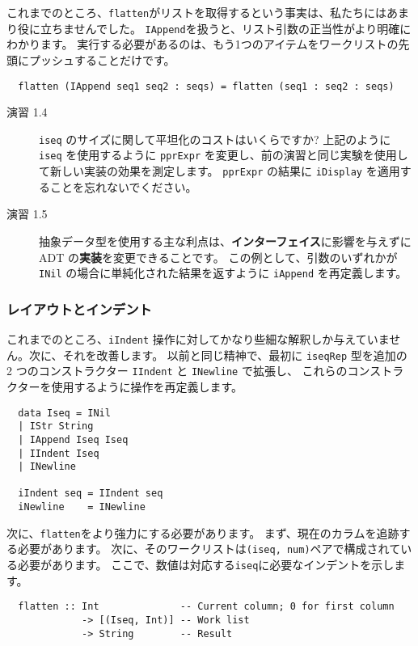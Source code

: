 \documentclass{jarticle}
\begin{document}
これまでのところ、\texttt{flatten}がリストを取得するという事実は、私たちにはあまり役に立ちませんでした。
\texttt{IAppend}を扱うと、リスト引数の正当性がより明確にわかります。
実行する必要があるのは、もう1つのアイテムをワークリストの先頭にプッシュすることだけです。

\begin{verbatim}
  flatten (IAppend seq1 seq2 : seqs) = flatten (seq1 : seq2 : seqs)
\end{verbatim}

\begin{description}
	\item[演習 1.4] \texttt{iseq} のサイズに関して平坦化のコストはいくらですか?
		上記のように \texttt{iseq} を使用するように \texttt{pprExpr} を変更し、前の演習と同じ実験を使用して新しい実装の効果を測定します。
		\texttt{pprExpr} の結果に \texttt{iDisplay} を適用することを忘れないでください。

	\item[演習 1.5] 抽象データ型を使用する主な利点は、\textbf{インターフェイス}に影響を与えずに ADT の\textbf{実装}を変更できることです。
		この例として、引数のいずれかが \texttt{INil} の場合に単純化された結果を返すように \texttt{iAppend} を再定義します。
\end{description}

\subsubsection{レイアウトとインデント}

これまでのところ、\texttt{iIndent} 操作に対してかなり些細な解釈しか与えていません。次に、それを改善します。
以前と同じ精神で、最初に \texttt{iseqRep} 型を追加の 2 つのコンストラクター \texttt{IIndent} と \texttt{INewline} で拡張し、
これらのコンストラクターを使用するように操作を再定義します。

\begin{verbatim}
  data Iseq = INil
  | IStr String
  | IAppend Iseq Iseq
  | IIndent Iseq
  | INewline

  iIndent seq = IIndent seq
  iNewline    = INewline
\end{verbatim}

次に、\texttt{flatten}をより強力にする必要があります。
まず、現在のカラムを追跡する必要があります。
次に、そのワークリストは\texttt{(iseq, num)}ペアで構成されている必要があります。
ここで、数値は対応する\texttt{iseq}に必要なインデントを示します。

\begin{verbatim}
  flatten :: Int              -- Current column; 0 for first column
             -> [(Iseq, Int)] -- Work list
             -> String        -- Result
\end{verbatim}
\end{document}
